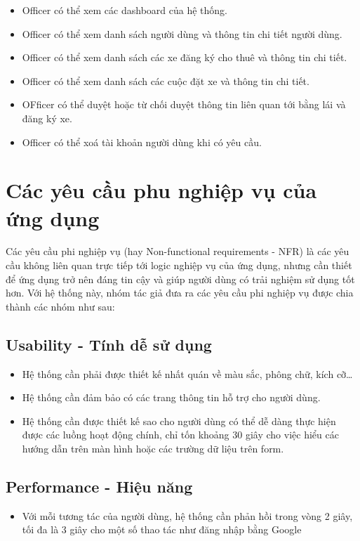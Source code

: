 \documentclass[../main.tex]{subfiles}
\begin{document}
	\begin{itemize}
		\item Officer có thể xem các dashboard của hệ thống.
		\item Officer có thể xem danh sách người dùng và thông tin chi tiết người dùng.
		\item Officer có thể xem danh sách các xe đăng ký cho thuê và thông tin chi tiết.
		\item Officer có thể xem danh sách các cuộc đặt xe và thông tin chi tiết.
		\item OFficer có thể duyệt hoặc từ chối duyệt thông tin liên quan tới bằng lái và đăng ký xe.
		\item Officer có thể xoá tài khoản người dùng khi có yêu cầu.
	\end{itemize}


	\section{Các yêu cầu phu nghiệp vụ của ứng dụng}

	Các yêu cầu phi nghiệp vụ (hay Non-functional requirements - NFR) là các yêu cầu không liên quan trực tiếp tới logic
	nghiệp vụ của ứng dụng, nhưng cần thiết để ứng dụng trở nên đáng tin cậy và giúp người dùng có trải nghiệm sử dụng tốt
	hơn. Với hệ thống này, nhóm tác giả đưa ra các yêu cầu phi nghiệp vụ được chia thành các nhóm như sau:

	\subsection{Usability - Tính dễ sử dụng}
	\begin{itemize}
		\item Hệ thống cần phải được thiết kế nhất quán về màu sắc, phông chữ, kích cỡ\ldots
		\item Hệ thống cần đảm bảo có các trang thông tin hỗ trợ cho người dùng.
		\item  Hệ thống cần được thiết kế sao cho người dùng có thể dễ dàng thực hiện được các luồng hoạt động chính, chỉ
		tốn khoảng 30 giây cho việc hiểu các hướng dẫn trên màn hình hoặc các trường dữ liệu trên form.
	\end{itemize}

	\subsection{Performance - Hiệu năng}
	\begin{itemize}
		\item Với mỗi tương tác của người dùng, hệ thống cần phản hồi trong vòng 2 giây, tối đa là 3 giây cho một số
		thao tác như đăng nhập bằng Google
	\end{itemize}
\end{document}
